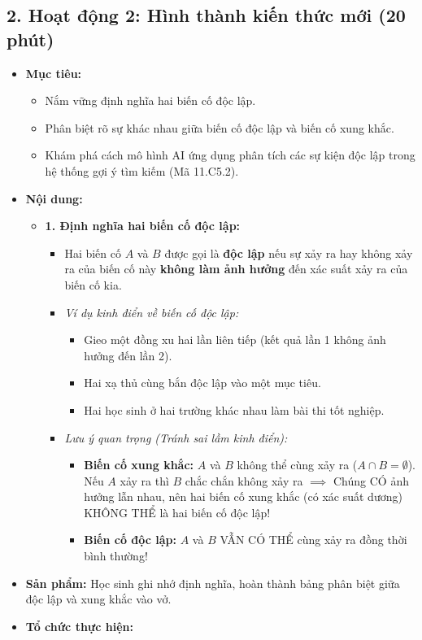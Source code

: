 \documentclass[12pt, a4paper]{article}
\begin{document}
\subsection*{2. Hoạt động 2: Hình thành kiến thức mới (20 phút)}

\begin{itemize}[leftmargin=1.2cm]
    \item[a)] \textbf{Mục tiêu:}
    \begin{itemize}[leftmargin=0.6cm]
        \item Nắm vững định nghĩa hai biến cố độc lập.
        \item Phân biệt rõ sự khác nhau giữa biến cố độc lập và biến cố xung khắc.
        \item Khám phá cách mô hình AI ứng dụng phân tích các sự kiện độc lập trong hệ thống gợi ý tìm kiếm (Mã 11.C5.2).
    \end{itemize}

    \item[b)] \textbf{Nội dung:}
    \begin{itemize}[leftmargin=0.6cm]
        \item \textbf{1. Định nghĩa hai biến cố độc lập:}
        \begin{itemize}
            \item Hai biến cố $A$ và $B$ được gọi là \textbf{độc lập} nếu sự xảy ra hay không xảy ra của biến cố này \textbf{không làm ảnh hưởng} đến xác suất xảy ra của biến cố kia.
            \item \textit{Ví dụ kinh điển về biến cố độc lập:}
            \begin{itemize}
                \item Gieo một đồng xu hai lần liên tiếp (kết quả lần 1 không ảnh hưởng đến lần 2).
                \item Hai xạ thủ cùng bắn độc lập vào một mục tiêu.
                \item Hai học sinh ở hai trường khác nhau làm bài thi tốt nghiệp.
            \end{itemize}
            \item \textit{Lưu ý quan trọng (Tránh sai lầm kinh điển):}
            \begin{itemize}
                \item \textbf{Biến cố xung khắc:} $A$ và $B$ không thể cùng xảy ra ($A \cap B = \emptyset$). Nếu $A$ xảy ra thì $B$ chắc chắn không xảy ra $\implies$ Chúng CÓ ảnh hưởng lẫn nhau, nên hai biến cố xung khắc (có xác suất dương) KHÔNG THỂ là hai biến cố độc lập!
                \item \textbf{Biến cố độc lập:} $A$ và $B$ VẪN CÓ THỂ cùng xảy ra đồng thời bình thường!
            \end{itemize}
        \end{itemize}
    \end{itemize}

    \item[c)] \textbf{Sản phẩm:} Học sinh ghi nhớ định nghĩa, hoàn thành bảng phân biệt giữa độc lập và xung khắc vào vở.
    \item[d)] \textbf{Tổ chức thực hiện:}
\end{itemize}
\end{document}
